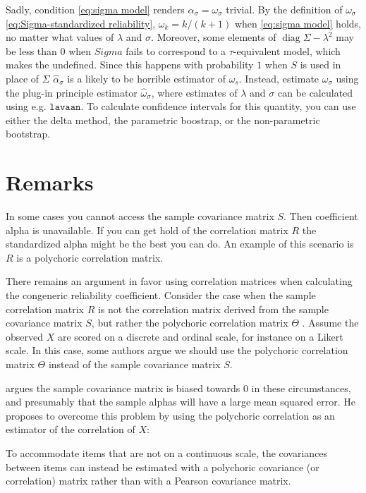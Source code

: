 \documentclass{article}
\theoremstyle{plain}
\theoremstyle{plain}
\theoremstyle{definition}
\theoremstyle{remark}
\theoremstyle{definition}
\theoremstyle{plain}
\theoremstyle{plain}
\theoremstyle{definition}
\DeclareMathOperator{\diag}{diag}
\begin{document}
Sadly, condition \eqref{eq:sigma model} renders $\alpha_{\sigma}=\omega_{\sigma}$
trivial. By the definition of $\omega_{\sigma}$ \eqref{eq:Sigma-standardized reliability},
$\omega_{k}=k/\left(k+1\right)$ when \eqref{eq:sigma model} holds, no matter what values of $\lambda$ and $\sigma$.
Moreover, some elements of $\diag\Sigma-\lambda^{2}$ may be less
than $0$ when $Sigma$ fails to correspond to a $\tau$-equivalent model, which makes the undefined. Since this happens with probability $1$ when $S$ is used in place of $\Sigma$ $\widehat{\alpha}_{\sigma}$
is a likely to be horrible estimator of $\omega_{s}$. Instead,
estimate $\omega_{\sigma}$ using the plug-in principle estimator
$\widehat{\omega}_{\sigma}$, where estimates of $\lambda$ and $\sigma$
can be calculated using e.g. $\texttt{lavaan}$. To calculate confidence
intervals for this quantity, you can use either the delta method,
the parametric boostrap, or the non-parametric bootstrap.

\section{Remarks}
In some cases you cannot access the sample covariance matrix $S$. Then coefficient alpha is unavailable. If you can get hold of the correlation matrix $R$ the standardized alpha might be the best you can do. An example of this scenario is $R$ is a polychoric correlation matrix.

There remains an argument in favor using correlation matrices when calculating the congeneric reliability coefficient. Consider the case when the sample correlation matrix $R$ is not the correlation matrix derived from the sample covariance matrix $S$, but rather the polychoric correlation matrix $\Theta$ \citep{Olsson1979-ti}. Assume the observed $X$ are scored on a discrete and ordinal scale, for instance on a Likert scale. In this case, some authors argue we should use the polychoric correlation matrix $\Theta$ instead of the sample covariance matrix $S$. 

\citet[][p. 415]{McNeish2018-vu} argues the sample covariance matrix is biased towards $0$ in these circumstances, and presumably that the sample alphas will have a large mean squared error. He proposes to overcome this problem by using the polychoric correlation as an estimator of the correlation of $X$:

\begin{displayquote}To accommodate items that are not on a continuous scale, the
covariances between items can instead be estimated with a polychoric covariance (or correlation) matrix rather than with a Pearson covariance matrix.
\end{displayquote}
\end{document}
